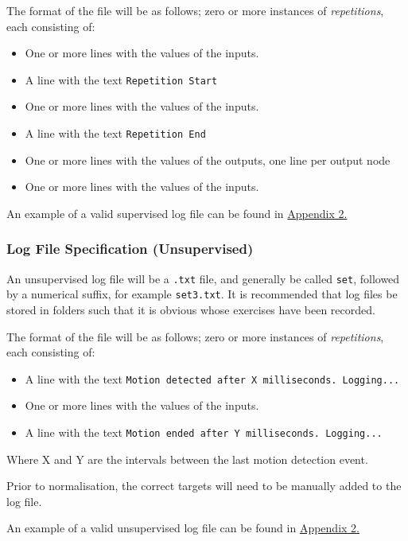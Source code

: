 \documentclass[a4paper]{article}
\begin{document}
The format of the file will be as follows; zero or more instances of \emph{repetitions}, each consisting of:

\begin{itemize}
\item One or more lines with the values of the inputs.
\item A line with the text \lstinline{Repetition Start}
\item One or more lines with the values of the inputs.
\item A line with the text \lstinline{Repetition End}
\item One or more lines with the values of the outputs, one line per output node
\item One or more lines with the values of the inputs.
\end{itemize}

An example of a valid supervised log file can be found in \hyperref[subsubsec:a2_lf_supervised]{Appendix 2.}

\subsubsection{Log File Specification (Unsupervised)}

An unsupervised log file will be a \lstinline{.txt} file, and generally be called \lstinline{set}, followed by a numerical suffix, for example \lstinline{set3.txt}. It is recommended that log files be stored in folders such that it is obvious whose exercises have been recorded.

The format of the file will be as follows; zero or more instances of \emph{repetitions}, each consisting of:

\begin{itemize}
\item A line with the text \lstinline{Motion detected after X milliseconds. Logging...}
\item One or more lines with the values of the inputs.
\item A line with the text \lstinline{Motion ended after Y milliseconds. Logging...}
\end{itemize}

Where X and Y are the intervals between the last motion detection event.

Prior to normalisation, the correct targets will need to be manually added to the log file.

An example of a valid unsupervised log file can be found in \hyperref[subsubsec:a2_lf_unsupervised]{Appendix 2.}
\end{document}
